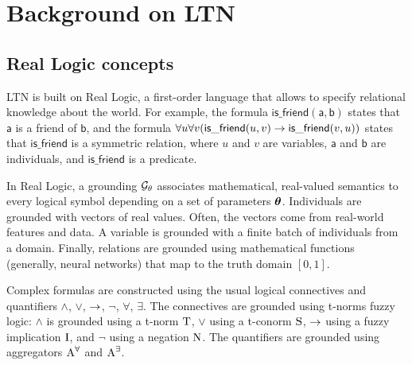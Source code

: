 \documentclass{article}
\theoremstyle{definition}
\begin{document}
\section{Background on LTN}
\label{s:ltn_background}

\subsection{Real Logic concepts}

\def\Friend{\mathsf{is\_friend}}
\def\shortFriend{\mathsf{f}}
\def\bob{\mathsf{b}}
\def\alice{\mathsf{a}}
\def\charlie{\mathsf{charlie}}
\def\shortbob{\mathsf{b}}
\def\shortalice{\mathsf{a}}
\def\shortcharlie{\mathsf{c}}
\def\Italian{\mathsf{Italian}}
\def\height{\mathsf{height}}
\def\istall{\mathsf{is\_tall}}
\def\people{\mathsf{people}}
\def\bx{\mathbf{x}}
\def\by{\mathbf{y}}
\def\bestfriend{\mathsf{best\_friend}}
\def\Parent{\mathsf{is\_parent}}
\def\age{\mathsf{age}}


\label{s:ltn_semantics}
LTN is built on Real Logic, a first-order language that allows to specify relational knowledge about the world.
For example, the formula $\Friend(\alice,\bob)$ states that $\alice$ is a friend of $\bob$,
and the formula $\forall u \forall v (\Friend(u,v) \imp \Friend(v,u))$ states that $\Friend$ is a symmetric relation, 
where $u$ and $v$ are variables, $\alice$ and $\bob$ are individuals, and $\Friend$ is a predicate.

In Real Logic, a grounding $\mathcal{G}_\theta$ associates mathematical, real-valued semantics to every logical symbol depending on a set of parameters $\boldsymbol{\theta}$. 
Individuals are grounded with vectors of real values.
Often, the vectors come from real-world features and data.
A variable is grounded with a finite batch of individuals from a domain.
Finally, relations are grounded using mathematical functions (generally, neural networks) that map to the truth domain $[0,1]$. 

Complex formulas are constructed using the usual logical connectives and quantifiers $\land$, $\lor$, $\rightarrow$, $\lnot$, $\forall$, $\exists$.
The connectives are grounded using t-norms fuzzy logic:
$\land$ is grounded using a t-norm $\operatorname{T}$, 
$\lor$ using a t-conorm $\operatorname{S}$, 
$\rightarrow$ using a fuzzy implication $\operatorname{I}$, 
and $\lnot$ using a negation $\operatorname{N}$.
The quantifiers are grounded using aggregators $\operatorname{A}^\forall$ and $\operatorname{A}^\exists$.
\end{document}
